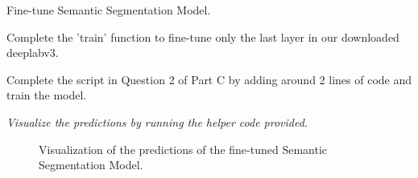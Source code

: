 \documentclass{myhw}
\begin{document}
\begin{homeworkProblem}
Fine-tune Semantic Segmentation Model.
\begin{homeworkSection}
Complete the 'train' function to fine-tune only the last layer in our downloaded deeplabv3.
\end{homeworkSection}
\begin{homeworkSection}
Complete the script in Question 2 of Part C by adding around 2 lines of code and train the model.
\end{homeworkSection}
\begin{homeworkSection}
\emph{Visualize the predictions by running the helper code provided.} 
\begin{figure}[h]
  \centering
  \hspace{.3in} 
  \caption{Visualization of the predictions of the fine-tuned Semantic Segmentation Model.}
  \label{fig:seg_vis} %
\end{figure} \\

\end{homeworkSection}
\end{homeworkProblem}
\end{document}
